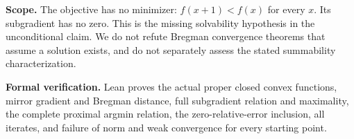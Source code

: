 \documentclass[11pt]{article}
\begin{document}
\noindent\textbf{Scope.} The objective has no minimizer: $f(x+1)<f(x)$ for every $x$. Its subgradient has no zero. This is the missing solvability hypothesis in the unconditional claim. We do not refute Bregman convergence theorems that assume a solution exists, and do not separately assess the stated summability characterization.

\noindent\textbf{Formal verification.} Lean proves the actual proper closed convex functions, mirror gradient and Bregman distance, full subgradient relation and maximality, the complete proximal argmin relation, the zero-relative-error inclusion, all iterates, and failure of norm and weak convergence for every starting point.
\end{document}
